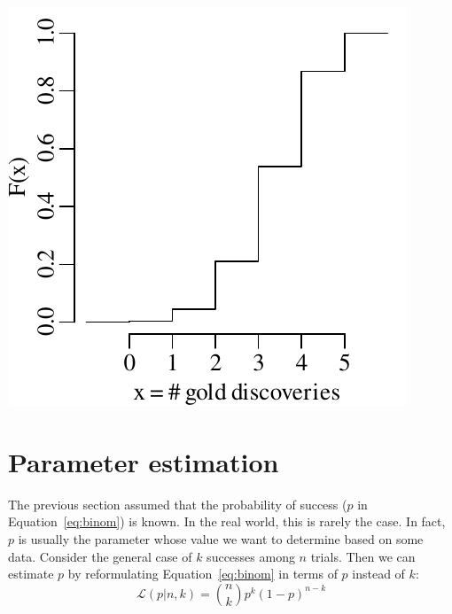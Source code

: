 \noindent\begin{minipage}[t][][b]{.3\textwidth}
  \includegraphics[width=\textwidth]{../figures/goldCDF.pdf}
\end{minipage}
\begin{minipage}[t][][t]{.7\textwidth}
  \label{fig:goldCDF}
\end{minipage}

\section{Parameter estimation}
\label{sec:binompar}

The previous section assumed that the probability of success ($p$ in
Equation~\ref{eq:binom}) is known.  In the real world, this is rarely
the case. In fact, $p$ is usually the parameter whose value we want to
determine based on some data. Consider the general case of $k$
successes among $n$ trials. Then we can estimate $p$ by reformulating
Equation~\ref{eq:binom} in terms of $p$ instead of $k$:
\begin{equation}
  \mathcal{L}(p|n,k) = \binom{n}{k} p^k (1-p)^{n-k}
  \label{eq:Lbinom}
\end{equation}

